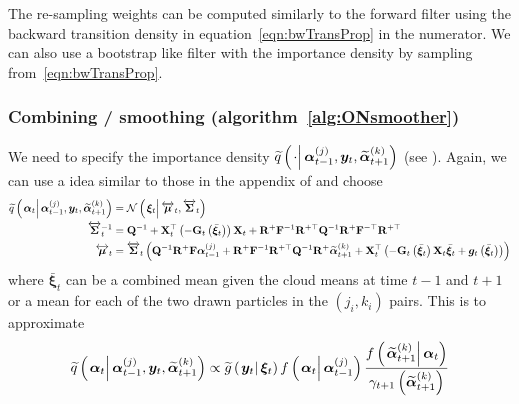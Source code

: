 \documentclass[9pt, notitlepage]{article}
\renewcommand{\vec}[1]{\bm{#1}}
\newcommand{\vecb}[1]{\bar{\vec{#1}}}
\newcommand{\vecLRarrow}[1]{\overleftrightarrow{\vec{#1}}}
\newcommand{\mat}[1]{\mathbf{#1}}
\newcommand{\matLRarrow}[1]{\overleftrightarrow{\mat{#1}}}
\newcommand{\Lparen}[1]{\left( #1\right)}
\newcommand{\Cond}[2]{\left. #1 \vphantom{#2} \right\vert  #2}
\newcommand{\optor}[2]{#1\Lparen{#2}}
\newcommand{\optorC}[3]{\optor{#1}{\Cond{#2}{#3}}}
\newcommand{\normalC}[3]{\optorC{\mathcal{N}}{#1}{#2,#3}}
\newcommand{\IDAproxC}[2]{\optorC{\widetilde{q}}{#1}{#2}}
\newcommand{\partic}[3]{#1_{#2}^{\Lparen{#3}}}
\newcommand{\particB}[3]{\widetilde{#1}_{#2}^{\Lparen{#3}}}
\begin{document}
The re-sampling weights can be computed similarly to the forward filter using the backward transition density in equation~\eqref{eqn:bwTransProp} in the numerator. We can also use a bootstrap like filter with the importance density by sampling from~\eqref{eqn:bwTransProp}.

\subsubsection*{Combining / smoothing (algorithm~\ref{alg:ONsmoother})}
We need to specify the importance density $\IDAproxC{\cdot}{\partic{\vec{\alpha}}{t-1}{j},\vec{y}_t, \particB{\vec{\alpha}}{t+1}{k}}$ (see \citet[page 453] {fearnhead10}). Again, we can use a idea similar to those in the appendix of \cite{fearnhead10} and choose%
%
{\scriptsize%
\begin{equation}\begin{split}
	\IDAproxC{\vec{\alpha}_t}{\partic{\vec{\alpha}}{t-1}{j},\vec{y}_t, \particB{\vec{\alpha}}{t+1}{k}}  &=   %
		\normalC{\vec{\xi}_t}{\vecLRarrow{\mu}_t}{\matLRarrow{\Sigma}_t} \\
%
	\matLRarrow{\Sigma}_t^{-1} &=
		\mat{Q}^{-1} +
		\mat{X}_t^\top\Lparen{-\mat{G}_t\Lparen{\vecb{\xi}_{t}}}
		\mat{X}_t + 
		\mat{R}^{+}\mat{F}^{-1}\mat{R}^{+\top}\mat{Q}^{-1}
		\mat{R}^{+}\mat{F}^{-\top}\mat{R}^{+\top}  \\
%
	\vecLRarrow{\mu}_t
	 &=  \matLRarrow{\Sigma}_t \Lparen{
		\mat{Q}^{-1}\mat{R}^+\mat{F}\partic{\vec{\alpha}}{t-1}{j} +
		\mat{R}^{+}\mat{F}^{-1}\mat{R}^{+\top}\mat{Q}^{-1}\mat{R}^+\particB{\vec{\alpha}}{t + 1}{k} +
		\mat{X}_t^\top
		\Lparen{
			-\mat{G}_t\Lparen{\vecb{\xi}_{t}}
			\mat{X}_t\vecb{\xi}_{t} +
			\vec{g}_t\Lparen{\vecb{\xi}_{t}}
		}}
\end{split}\end{equation}%
}%
%
where $\vecb{\xi}_t$ can be a combined mean given the cloud means at time $t - 1$ and $t + 1$ or a mean for each of the  two drawn particles in the $(j_i,k_i)$ pairs. This is to approximate%
%
%
\begin{equation}\begin{split}
	\IDAproxC{\vec{\alpha}_t}{\partic{\vec{\alpha}}{t-1}{j},\vec{y}_t, \particB{\vec{\alpha}}{t+1}{k}} \propto %
%
	\optorC{\widetilde{g}}{\vec{y}_t}{\vec{\xi}_t}
		\optorC{f}{\vec{\alpha}_t}{\partic{\vec{\alpha}}{t-1}{j}}
		\frac{
			\optorC{f}{\particB{\vec{\alpha}}{t+1}{k}}{\vec{\alpha}_t}
		}{
			\gamma_{t + 1}\Lparen{\particB{\vec{\alpha}}{t+1}{k}}
		}
\end{split}\end{equation}
\end{document}
